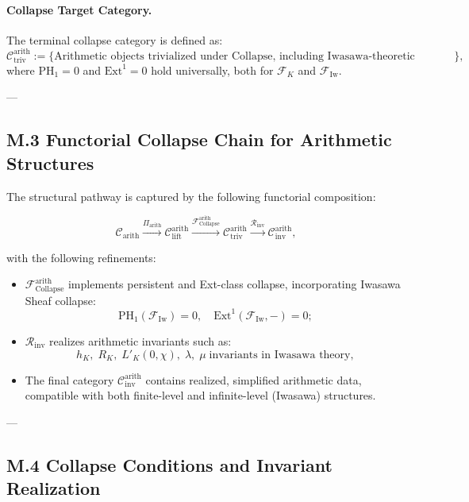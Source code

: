 \documentclass[11pt]{article}
\begin{document}
\paragraph{Collapse Target Category.}
The terminal collapse category is defined as:
\[
\mathcal{C}_{\mathrm{triv}}^{\mathrm{arith}} := \{ \text{Arithmetic objects trivialized under Collapse, including Iwasawa-theoretic refinements} \},
\]
where \( \mathrm{PH}_1 = 0 \) and \( \mathrm{Ext}^1 = 0 \) hold universally, both for \( \mathcal{F}_K \) and \( \mathcal{F}_{\mathrm{Iw}} \).

---

\subsection*{M.3 Functorial Collapse Chain for Arithmetic Structures}

The structural pathway is captured by the following functorial composition:

\[
\mathcal{C}_{\mathrm{arith}} 
\xrightarrow{\Pi_{\mathrm{arith}}} 
\mathcal{C}_{\mathrm{lift}}^{\mathrm{arith}} 
\xrightarrow{\mathcal{F}_{\mathrm{Collapse}}^{\mathrm{arith}}} 
\mathcal{C}_{\mathrm{triv}}^{\mathrm{arith}} 
\xrightarrow{\mathcal{R}_{\mathrm{inv}}} 
\mathcal{C}_{\mathrm{inv}}^{\mathrm{arith}},
\]

with the following refinements:
\begin{itemize}
  \item \( \mathcal{F}_{\mathrm{Collapse}}^{\mathrm{arith}} \) implements persistent and Ext-class collapse, incorporating Iwasawa Sheaf collapse:
  \[
  \mathrm{PH}_1(\mathcal{F}_{\mathrm{Iw}}) = 0, \quad \mathrm{Ext}^1(\mathcal{F}_{\mathrm{Iw}}, -) = 0;
  \]
  \item \( \mathcal{R}_{\mathrm{inv}} \) realizes arithmetic invariants such as:
  \[
  h_K,\; R_K,\; L'_K(0,\chi),\; \lambda,\;\mu\;\text{invariants in Iwasawa theory},
  \]
  \item The final category \( \mathcal{C}_{\mathrm{inv}}^{\mathrm{arith}} \) contains realized, simplified arithmetic data, compatible with both finite-level and infinite-level (Iwasawa) structures.
\end{itemize}

---

\subsection*{M.4 Collapse Conditions and Invariant Realization}
\end{document}
